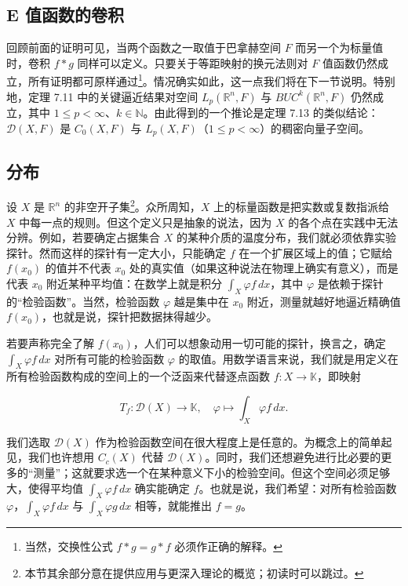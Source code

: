 \subsection*{E 值函数的卷积}

回顾前面的证明可见，当两个函数之一取值于巴拿赫空间 $ F $ 而另一个为标量值时，卷积 $ f * g $ 同样可以定义。只要关于等距映射的换元法则对 $ F $ 值函数仍然成立，所有证明都可原样通过\footnote{当然，交换性公式 $ f * g = g * f $ 必须作正确的解释。}。情况确实如此，这一点我们将在下一节说明。特别地，定理 7.11 中的关键逼近结果对空间 $ L_{p}(\mathbb{R}^{n},F) $ 与 $ BUC^{k}(\mathbb{R}^{n},F) $ 仍然成立，其中 $ 1 \le p < \infty $、$ k \in \mathbb{N} $。由此得到的一个推论是定理 7.13 的类似结论：$ \mathcal{D}(X,F) $ 是 $ C_{0}(X,F) $ 与 $ L_{p}(X,F) $（$ 1 \le p < \infty $）的稠密向量子空间。

\subsection*{分布}

设 $ X $ 是 $ \mathbb{R}^{n} $ 的非空开子集\footnote{本节其余部分意在提供应用与更深入理论的概览；初读时可以跳过。}。众所周知，$ X $ 上的标量函数是把实数或复数指派给 $ X $ 中每一点的规则。但这个定义只是抽象的说法，因为 $ X $ 的各个点在实践中无法分辨。例如，若要确定占据集合 $ X $ 的某种介质的温度分布，我们就必须依靠实验探针。然而这样的探针有一定大小，只能确定 $ f $ 在一个扩展区域上的值；它赋给 $ f(x_{0}) $ 的值并不代表 $ x_{0} $ 处的真实值（如果这种说法在物理上确实有意义），而是代表 $ x_{0} $ 附近某种平均值：在数学上就是积分 $ \int_{X}\varphi f\,dx $，其中 $ \varphi $ 是依赖于探针的“检验函数”。当然，检验函数 $ \varphi $ 越是集中在 $ x_{0} $ 附近，测量就越好地逼近精确值 $ f(x_{0}) $，也就是说，探针把数据抹得越少。

若要声称完全了解 $ f(x_{0}) $，人们可以想象动用一切可能的探针，换言之，确定 $ \int_{X}\varphi f\,dx $ 对所有可能的检验函数 $ \varphi $ 的取值。用数学语言来说，我们就是用定义在所有检验函数构成的空间上的一个泛函来代替逐点函数 $ f : X \to \mathbb{K} $，即映射

\begin{equation}
T_{f} : \mathcal{D}(X) \to \mathbb{K} , \quad \varphi \mapsto \int_{X}\varphi f\,dx .\tag{7.12}
\end{equation}

我们选取 $ \mathcal{D}(X) $ 作为检验函数空间在很大程度上是任意的。为概念上的简单起见，我们也许想用 $ C_{c}(X) $ 代替 $ \mathcal{D}(X) $。同时，我们还想避免进行比必要的更多的“测量”；这就要求选一个在某种意义下小的检验空间。但这个空间必须足够大，使得平均值 $ \int_{X}\varphi f\,dx $ 确实能确定 $ f $。也就是说，我们希望：对所有检验函数 $ \varphi $，$ \int_{X}\varphi f\,dx $ 与 $ \int_{X}\varphi g\,dx $ 相等，就能推出 $ f = g $。

